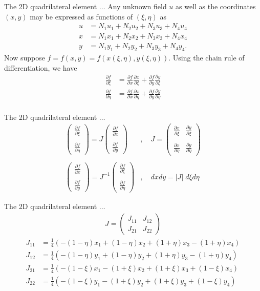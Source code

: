 \documentclass[handout]{beamer}
{
\usepackage{fullpage}
\usepackage{hyperref}
\usepackage{amssymb} 
}
\newcommand{\pmat}[1]{\begin{pmatrix}#1\end{pmatrix}}
\newcommand{\pder}[2]{\frac{\partial #1}{\partial #2}}
\begin{document}
\begin{frame}{The 2D quadrilateral element $\ldots$}
Any unknown field $u$ as well as the coordinates $(x, y)$
may be expressed as functions of $(\xi, \eta)$ as
\begin{align*}
u   &= N_1 u_1 + N_2 u_2 + N_3 u_3 + N_4 u_4 \\
x   &= N_1 x_1 + N_2 x_2 + N_3 x_3 + N_4 x_4 \\
y   &= N_1 y_1 + N_2 y_2 + N_3 y_3 + N_4 y_4.
\end{align*}
Now suppose $f = f(x,y)=f(x(\xi, \eta),y(\xi, \eta))$. Using the 
chain rule of differentiation, we have
\begin{align*}
\pder{f}{\xi}   &= \pder{f}{x}\pder{x}{\xi} + \pder{f}{y}\pder{y}{\xi} \\
\pder{f}{\eta}  &= \pder{f}{x}\pder{x}{\eta} + \pder{f}{y}\pder{y}{\eta} \\
\end{align*}

\end{frame}

\begin{frame}{The 2D quadrilateral element $\ldots$}
\begin{align*}
\pmat{ \pder{f}{\xi} \\ \\
   \pder{f}{\eta}  
}
=
J
\pmat{ \pder{f}{x} \\ \\
   \pder{f}{y}  
}&, \quad
J=
\pmat{ \pder{x}{\xi}  & \pder{y}{\xi} \\ \\
       \pder{x}{\eta} & \pder{y}{\eta}
}
\\ \\
\pmat{ \pder{f}{x} \\ \\
   \pder{f}{y}  
}
=
J^{-1}
\pmat{ \pder{f}{\xi} \\ \\
   \pder{f}{\eta}  
}&, \quad
dx  dy = |J|\; d\xi  d\eta
\end{align*}

\end{frame}

\begin{frame}{The 2D quadrilateral element $\ldots$}
\begin{align*}
J = \pmat{ J_{11} & J_{12} \\ J_{21} & J_{22} }
\end{align*}
\begin{align*}
J_{11}&=\frac{1}{4} 
\left ( 
  -(1-\eta) x_1 + (1-\eta) x_2 + (1+\eta) x_3 - (1 + \eta) x_4
\right ) \\
J_{12}&=\frac{1}{4} 
\left ( 
  -(1-\eta) y_1 + (1-\eta) y_2 + (1+\eta) y_3 - (1 + \eta) y_4
\right ) \\
J_{21}&=\frac{1}{4} 
\left ( 
  -(1-\xi) x_1 - (1+\xi) x_2 + (1+\xi) x_3 + (1 - \xi) x_4
\right ) \\
J_{22}&=\frac{1}{4} 
\left ( 
  -(1-\xi) y_1 - (1+\xi) y_2 + (1+\xi) y_3 + (1 - \xi) y_4
\right )
\end{align*}

\end{frame}
\end{document}
